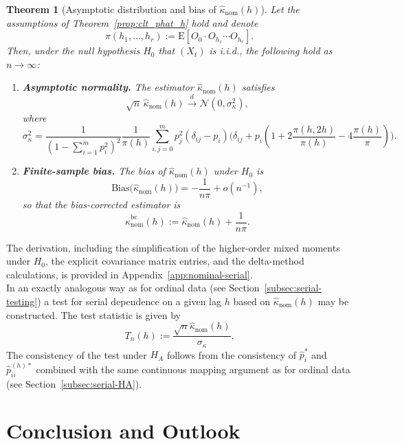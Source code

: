 ﻿\documentclass[12pt,a4paper]{scrreprt}
\newtheorem{theorem}{Theorem}[chapter]
\theoremstyle{definition}
\begin{document}
\begin{theorem}[Asymptotic distribution and bias of 
$\hat{\kappa}_{\mathrm{nom}}(h)$]
\label{prop:kappanom-asymp}
Let the assumptions of Theorem~\ref{prop:clt_phat_h} hold and denote
\[
    \pi(h_1,\ldots,h_r) := \mathrm{E}[O_0\cdot O_{h_1}\cdots O_{h_r}].
\]
Then, under the null hypothesis $H_0$ that $(X_t)$ is i.i.d., the 
following hold as $n\to\infty$:
\begin{enumerate}
    \item \textbf{Asymptotic normality.} The estimator 
    $\hat{\kappa}_{\mathrm{nom}}(h)$ satisfies
    \[
        \sqrt{n}\,\hat{\kappa}_{\mathrm{nom}}(h) 
        \xrightarrow{d} \mathcal{N}(0,\sigma^2_\kappa),
    \]
    where
    \[
        \sigma^2_\kappa =
        \frac{1}{(1-\sum_{i=1}^{m}p_i^2)^2} \frac{1}{\pi(h)} \sum_{i, j = 0}^{m}p_j^2 
        (\delta_{ij}-p_i)\bigl(\delta_{ij} +  p_i (1+ 2\frac{\pi(h, 2h)}{\pi(h)} -
         4\frac{\pi(h)}{\pi})\bigr).
    \]
    \item \textbf{Finite-sample bias.} The bias of 
    $\hat{\kappa}_{\mathrm{nom}}(h)$ under $H_0$ is
    \[
        \mathrm{Bias}\bigl(\hat{\kappa}_{\mathrm{nom}}(h)\bigr) 
        = -\frac{1}{n \pi}+ o(n^{-1}),
    \]
    so that the bias-corrected estimator is
    \[
        \hat{\kappa}^{\mathrm{bc}}_{\mathrm{nom}}(h) 
        := \hat{\kappa}_{\mathrm{nom}}(h) + \frac{1}{n\pi}.
    \]
\end{enumerate}
\end{theorem}
\noindent The derivation, including the simplification of the higher-order mixed moments under $H_0$, the explicit 
covariance matrix entries, and the delta-method calculations, is provided in Appendix~\ref{app:nominal-serial}.\\
In an exactly analogous way as for ordinal data (see Section~\ref{subsec:serial-testing}) a test for serial dependence on a given lag $h$
based on $\hat{\kappa}_{\mathrm{nom}}(h)$ may be constructed. The test statistic is given by
\[T_n(h):= \frac{\sqrt{n}\hat{\kappa}_{\mathrm{nom}}(h)}{\sigma_{\kappa}}.\] 
The consistency of the test under $H_A$ follows from the consistency of $\hat{p}_i^{*}$ and $\hat{p}_{ii}^{(h)*}$
combined with the same continuous mapping argument as for ordinal data (see Section~\ref{subsec:serial-HA}).

\chapter*{Conclusion and Outlook}
\end{document}
